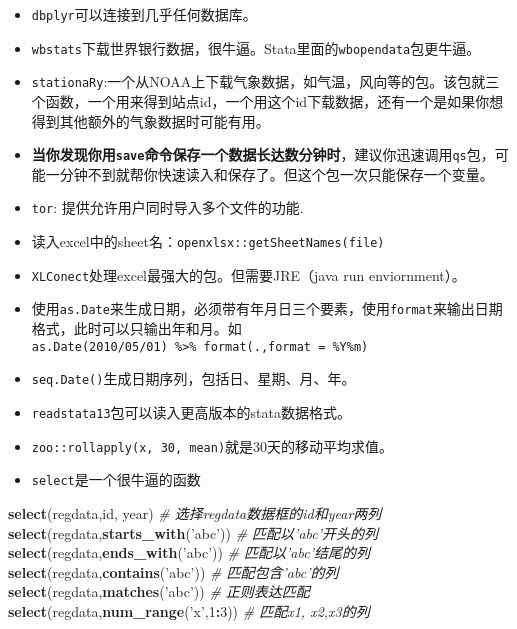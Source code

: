 \documentclass[
]{book}
\newenvironment{Shaded}{\begin{snugshade}}{\end{snugshade}}
\newcommand{\CommentTok}[1]{\textcolor[rgb]{0.56,0.35,0.01}{\textit{#1}}}
\newcommand{\DecValTok}[1]{\textcolor[rgb]{0.00,0.00,0.81}{#1}}
\newcommand{\KeywordTok}[1]{\textcolor[rgb]{0.13,0.29,0.53}{\textbf{#1}}}
\newcommand{\NormalTok}[1]{#1}
\newcommand{\OperatorTok}[1]{\textcolor[rgb]{0.81,0.36,0.00}{\textbf{#1}}}
\newcommand{\StringTok}[1]{\textcolor[rgb]{0.31,0.60,0.02}{#1}}
\begin{document}
\begin{itemize}
\item
  \texttt{dbplyr}可以连接到几乎任何数据库。
\item
  \texttt{wbstats}下载世界银行数据，很牛逼。Stata里面的\texttt{wbopendata}包更牛逼。
\item
  \texttt{stationaRy}:一个从NOAA上下载气象数据，如气温，风向等的包。该包就三个函数，一个用来得到站点id，一个用这个id下载数据，还有一个是如果你想得到其他额外的气象数据时可能有用。
\item
  \textbf{当你发现你用\texttt{save}命令保存一个数据长达数分钟时}，建议你迅速调用\texttt{qs}包，可能一分钟不到就帮你快速读入和保存了。但这个包一次只能保存一个变量。
\item
  \texttt{tor}: 提供允许用户同时导入多个文件的功能.
\item
  读入excel中的sheet名：\texttt{openxlsx::getSheetNames(file)}
\item
  \texttt{XLConect}处理excel最强大的包。但需要JRE（java run enviornment）。
\item
  使用\texttt{as.Date}来生成日期，必须带有年月日三个要素，使用\texttt{format}来输出日期格式，此时可以只输出年和月。如\texttt{as.Date(\textquotesingle{}2010/05/01\textquotesingle{})\ \%\textgreater{}\%\ format(.,format\ =\ \textquotesingle{}\%Y\%m\textquotesingle{})}
\item
  \texttt{seq.Date()}生成日期序列，包括日、星期、月、年。
\item
  \texttt{readstata13}包可以读入更高版本的stata数据格式。
\item
  \texttt{zoo::rollapply(x,\ 30,\ mean)}就是30天的移动平均求值。
\item
  \texttt{select}是一个很牛逼的函数
\end{itemize}

\begin{Shaded}
\begin{Highlighting}[]
\KeywordTok{select}\NormalTok{(regdata,id, year) }\CommentTok{# 选择regdata数据框的id和year两列}
\KeywordTok{select}\NormalTok{(regdata,}\KeywordTok{starts_with}\NormalTok{(}\StringTok{'abc'}\NormalTok{)) }\CommentTok{# 匹配以'abc'开头的列}
\KeywordTok{select}\NormalTok{(regdata,}\KeywordTok{ends_with}\NormalTok{(}\StringTok{'abc'}\NormalTok{)) }\CommentTok{# 匹配以'abc'结尾的列}
\KeywordTok{select}\NormalTok{(regdata,}\KeywordTok{contains}\NormalTok{(}\StringTok{'abc'}\NormalTok{)) }\CommentTok{# 匹配包含'abc'的列}
\KeywordTok{select}\NormalTok{(regdata,}\KeywordTok{matches}\NormalTok{(}\StringTok{'abc'}\NormalTok{)) }\CommentTok{# 正则表达匹配}
\KeywordTok{select}\NormalTok{(regdata,}\KeywordTok{num_range}\NormalTok{(}\StringTok{'x'}\NormalTok{,}\DecValTok{1}\OperatorTok{:}\DecValTok{3}\NormalTok{)) }\CommentTok{# 匹配x1, x2,x3的列}
\end{Highlighting}
\end{Shaded}
\end{document}
